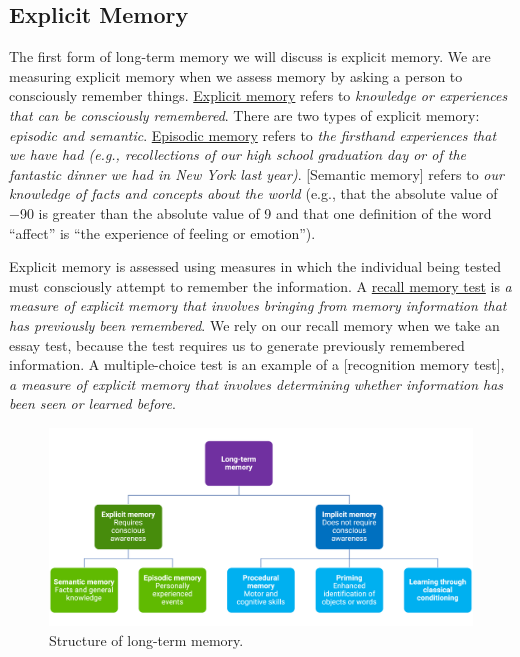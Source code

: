 \documentclass[
]{krantz}
\begin{document}
\hypertarget{explicit-memory}{%
\subsection*{Explicit Memory}\label{explicit-memory}}


The first form of long-term memory we will discuss is explicit memory. We are measuring explicit memory when we assess memory by asking a person to consciously remember things. \protect\hyperlink{explicit-memory}{Explicit memory} refers to \emph{knowledge or experiences that can be consciously remembered}. There are two types of explicit memory: \emph{episodic and semantic}. \protect\hyperlink{episodic-memory}{Episodic memory} refers to \emph{the firsthand experiences that we have had (e.g., recollections of our high school graduation day or of the fantastic dinner we had in New York last year)}. {[}Semantic memory{]} refers to \emph{our knowledge of facts and concepts about the world} (e.g., that the absolute value of −90 is greater than the absolute value of 9 and that one definition of the word ``affect'' is ``the experience of feeling or emotion'').

Explicit memory is assessed using measures in which the individual being tested must consciously attempt to remember the information. A \protect\hyperlink{recall-memory-test}{recall memory test} is \emph{a measure of explicit memory that involves bringing from memory information that has previously been remembered}. We rely on our recall memory when we take an essay test, because the test requires us to generate previously remembered information. A multiple-choice test is an example of a {[}recognition memory test{]}, \emph{a measure of explicit memory that involves determining whether information has been seen or learned before}.

\begin{figure}

{\centering \includegraphics[width=0.9\linewidth]{images/ch5/fig2} 

}

\caption{Structure of long-term memory.}\label{fig:structure}
\end{figure}
\end{document}
